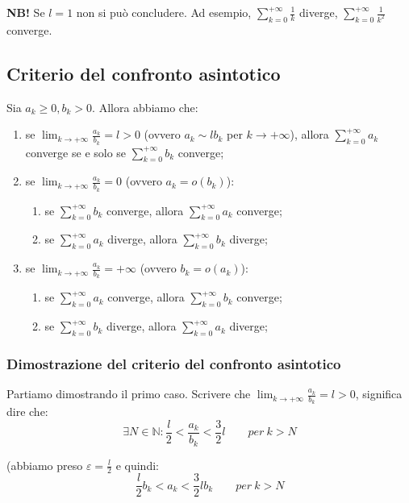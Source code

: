 \documentclass{article}
\begin{document}
\noindent\textbf{NB!} Se $l = 1$ non si può concludere. Ad esempio, $\sum_{k = 0}^{+\infty} \frac{1}{k}$ diverge, $\sum_{k = 0}^{+\infty} \frac{1}{k^2}$ converge.

\subsection{Criterio del confronto asintotico}
Sia $a_k \geq 0, b_k > 0$. Allora abbiamo che:
\begin{enumerate}
    \item se $\lim_{k \to +\infty} \frac{a_k}{b_k} = l > 0$ (ovvero $a_k \sim lb_k$ per $k \to +\infty$), allora $\sum_{k = 0}^{+\infty} a_k$ converge se e solo se $\sum_{k = 0}^{+\infty} b_k$ converge;
    \item se $\lim_{k \to +\infty} \frac{a_k}{b_k} = 0$ (ovvero $a_k = o(b_k)$): 
    \begin{enumerate}
        \item se $\sum_{k = 0}^{+\infty} b_k$ converge, allora $\sum_{k = 0}^{+\infty} a_k$ converge;
        \item se $\sum_{k = 0}^{+\infty} a_k$ diverge, allora $\sum_{k = 0}^{+\infty} b_k$ diverge;
    \end{enumerate}
    \item se $\lim_{k \to +\infty} \frac{a_k}{b_k} = +\infty$ (ovvero $b_k = o(a_k)$): 
    \begin{enumerate}
        \item se $\sum_{k = 0}^{+\infty} a_k$ converge, allora $\sum_{k = 0}^{+\infty} b_k$ converge;
        \item se $\sum_{k = 0}^{+\infty} b_k$ diverge, allora $\sum_{k = 0}^{+\infty} a_k$ diverge;
    \end{enumerate}
\end{enumerate}

\subsubsection{Dimostrazione del criterio del confronto asintotico}
Partiamo dimostrando il primo caso. Scrivere che $\lim_{k \to +\infty} \frac{a_k}{b_k} = l > 0$, significa dire che:
\begin{equation*}
    \exists N \in \mathbb{N} : \frac{l}{2} < \frac{a_k}{b_k} < \frac{3}{2}l \qquad per \ k > N
\end{equation*}

\noindent (abbiamo preso $\varepsilon = \frac{l}{2}$ e quindi:
\begin{equation*}
    \frac{l}{2} b_k < a_k < \frac{3}{2}lb_k \qquad per \ k > N
\end{equation*}
\end{document}
